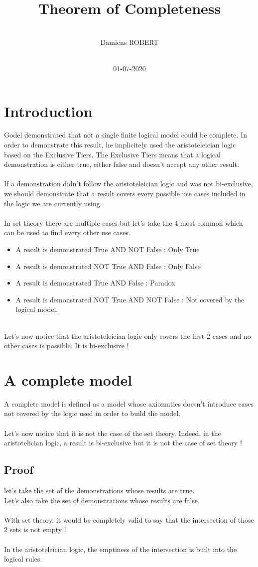\documentclass{article}
\title{
Theorem of Completeness
}
\date{
~\\
01-07-2020
}
\author{
~\\
Damiens ROBERT
}
\begin{document}
  \maketitle
  \section{Introduction}
  Godel demonstrated that not a single finite logical model could be complete. In order to demonstrate this result, he implicitely used the aristoteleician logic based on the Exclusive Tiers. The Exclusive Tiers means that a logical demonstration is either true, either false and doesn't accept any other result.
  ~\\
  ~\\
  If a demonstration didn't follow the aristoteleician logic and was not bi-exclusive, we should demonstrate that a result covers every possible use cases included in the logic we are currently using.
  ~\\
  ~\\
  In set theory there are multiple cases but let's take the 4 most common which can be used to find every other use cases.
  ~\\
  \begin{itemize}
  \item
  A result is demonstrated True AND NOT False : Only True
  \item
  A result is demonstrated NOT True AND False : Only False
  \item
  A result is demonstrated True AND False : Paradox
  \item
  A result is demonstrated NOT True AND NOT False : Not covered by the logical model.
  \end{itemize}
  ~\\
  Let's now notice that the aristoteleician logic only covers the first 2 cases and no other cases is possible. It is bi-exclusive !
  \section{A complete model}
  A complete model is defined as a model whose axiomatics doesn't introduce cases not covered by the logic used in order to build the model.
  ~\\
  ~\\
Let's now notice that it is not the case of the set theory. Indeed, in the aristotelician logic, a result is bi-exclusive but it is not the case of set theory !  \subsection{Proof}
  let's take the set of the demonstrations whose results are true.
  ~\\
  Let's also take the set of demonstrations whose results are false. 
  ~\\
  ~\\
  With set theory, it would be completely valid to say that the intersection of those 2 sets is not empty !
  ~\\
  ~\\
  In the aristoteleician logic, the emptiness of the intersection is built into the logical rules.
  ~\\
  ~\\
\end{document}

